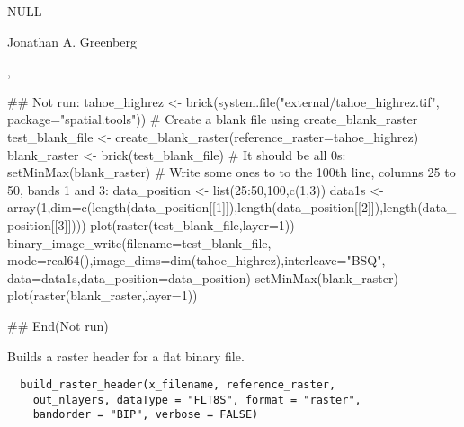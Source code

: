 \documentclass[a4paper]{book}
\begin{document}
%
\begin{Value}
NULL
\end{Value}
%
\begin{Author}\relax
Jonathan A. Greenberg
\end{Author}
%
\begin{SeeAlso}\relax
{},
\end{SeeAlso}
%
\begin{Examples}
\begin{ExampleCode}
## Not run: 
tahoe_highrez <- brick(system.file("external/tahoe_highrez.tif", package="spatial.tools"))
# Create a blank file using create_blank_raster
test_blank_file <- create_blank_raster(reference_raster=tahoe_highrez)
blank_raster <- brick(test_blank_file)
# It should be all 0s:
setMinMax(blank_raster)
# Write some ones to to the 100th line, columns 25 to 50, bands 1 and 3:
data_position <- list(25:50,100,c(1,3))
data1s <- array(1,dim=c(length(data_position[[1]]),length(data_position[[2]]),length(data_position[[3]])))
plot(raster(test_blank_file,layer=1))
binary_image_write(filename=test_blank_file,
	mode=real64(),image_dims=dim(tahoe_highrez),interleave="BSQ",
	data=data1s,data_position=data_position)
setMinMax(blank_raster)
plot(raster(blank_raster,layer=1))

## End(Not run)
\end{ExampleCode}
\end{Examples}
%
\begin{Description}\relax
Builds a raster header for a flat binary file.
\end{Description}
%
\begin{Usage}
\begin{verbatim}
  build_raster_header(x_filename, reference_raster,
    out_nlayers, dataType = "FLT8S", format = "raster",
    bandorder = "BIP", verbose = FALSE)
\end{verbatim}
\end{Usage}
%
\end{document}
